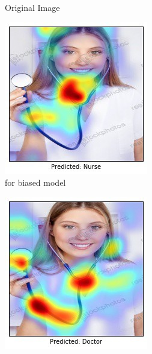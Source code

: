 \begin{figure}[ht!]
\begin{center}
\begin{subfigure}[b]{0.32\linewidth}
		\caption{\tiny{Original Image}}
        \vspace{10pt}
    \end{subfigure}
    \begin{subfigure}[b]{0.32\linewidth}
        \centering
        \includegraphics[width=1\linewidth]{figures/teaser/60_gcam_incorr_unbalanced.jpg}
		\caption{\tiny{\gcam{} for biased model}}
        \vspace{10pt}
    \end{subfigure}
    \begin{subfigure}[b]{0.32\linewidth}
        \centering
        \includegraphics[width=1\linewidth]{figures/teaser/60_gcam_corr_balanced.jpg}

\end{subfigure}
\end{center}
\end{figure}
